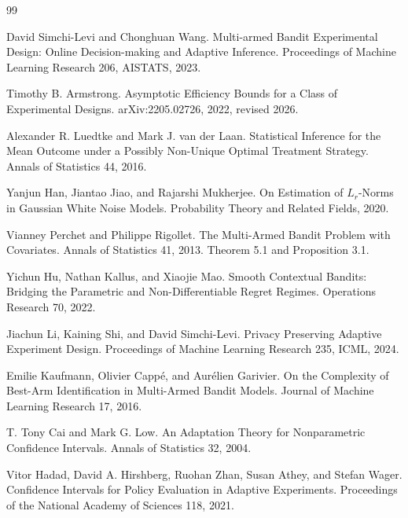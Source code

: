 \documentclass{article}
\begin{document}
\begin{thebibliography}{99}

   David Simchi-Levi and Chonghuan Wang. Multi-armed Bandit Experimental Design: Online Decision-making and Adaptive Inference. Proceedings of Machine Learning Research 206, AISTATS, 2023.

   Timothy B. Armstrong. Asymptotic Efficiency Bounds for a Class of Experimental Designs. arXiv:2205.02726, 2022, revised 2026.

   Alexander R. Luedtke and Mark J. van der Laan. Statistical Inference for the Mean Outcome under a Possibly Non-Unique Optimal Treatment Strategy. Annals of Statistics 44, 2016.

   Yanjun Han, Jiantao Jiao, and Rajarshi Mukherjee. On Estimation of \(L_r\)-Norms in Gaussian White Noise Models. Probability Theory and Related Fields, 2020.

   Vianney Perchet and Philippe Rigollet. The Multi-Armed Bandit Problem with Covariates. Annals of Statistics 41, 2013. Theorem 5.1 and Proposition 3.1.

   Yichun Hu, Nathan Kallus, and Xiaojie Mao. Smooth Contextual Bandits: Bridging the Parametric and Non-Differentiable Regret Regimes. Operations Research 70, 2022.

   Jiachun Li, Kaining Shi, and David Simchi-Levi. Privacy Preserving Adaptive Experiment Design. Proceedings of Machine Learning Research 235, ICML, 2024.

   Emilie Kaufmann, Olivier Cappé, and Aurélien Garivier. On the Complexity of Best-Arm Identification in Multi-Armed Bandit Models. Journal of Machine Learning Research 17, 2016.

   T. Tony Cai and Mark G. Low. An Adaptation Theory for Nonparametric Confidence Intervals. Annals of Statistics 32, 2004.

   Vitor Hadad, David A. Hirshberg, Ruohan Zhan, Susan Athey, and Stefan Wager. Confidence Intervals for Policy Evaluation in Adaptive Experiments. Proceedings of the National Academy of Sciences 118, 2021.


\end{thebibliography}
\end{document}
